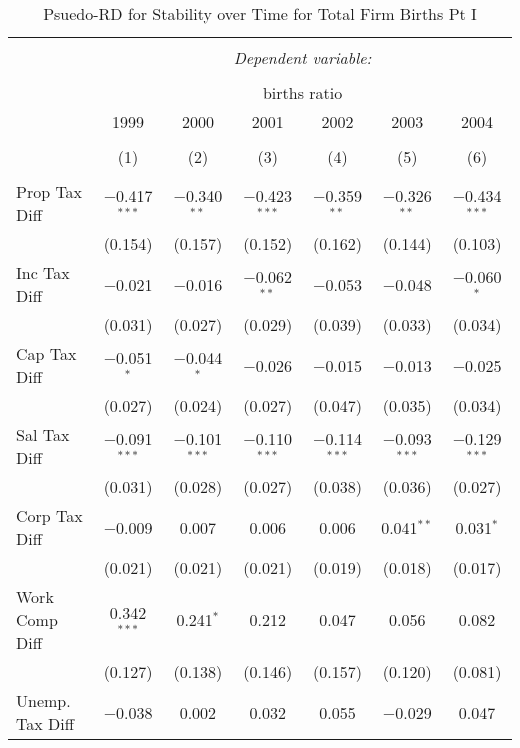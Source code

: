 
\begin{table}[!htbp] \centering 
  \caption{Psuedo-RD for Stability over Time for  Total Firm Births Pt I} 
  \label{--year} 
\small 
\begin{tabular}{@{\extracolsep{5pt}}lcccccc} 
\\[-1.8ex]\hline 
\hline \\[-1.8ex] 
 & \multicolumn{6}{c}{\textit{Dependent variable:}} \\ 
\cline{2-7} 
\\[-1.8ex] & \multicolumn{6}{c}{births ratio} \\ 
 & 1999 & 2000 & 2001 & 2002 & 2003 & 2004 \\ 
\\[-1.8ex] & (1) & (2) & (3) & (4) & (5) & (6)\\ 
\hline \\[-1.8ex] 
 Prop Tax Diff & $-$0.417$^{***}$ & $-$0.340$^{**}$ & $-$0.423$^{***}$ & $-$0.359$^{**}$ & $-$0.326$^{**}$ & $-$0.434$^{***}$ \\ 
  & (0.154) & (0.157) & (0.152) & (0.162) & (0.144) & (0.103) \\ 
  Inc Tax Diff & $-$0.021 & $-$0.016 & $-$0.062$^{**}$ & $-$0.053 & $-$0.048 & $-$0.060$^{*}$ \\ 
  & (0.031) & (0.027) & (0.029) & (0.039) & (0.033) & (0.034) \\ 
  Cap Tax Diff & $-$0.051$^{*}$ & $-$0.044$^{*}$ & $-$0.026 & $-$0.015 & $-$0.013 & $-$0.025 \\ 
  & (0.027) & (0.024) & (0.027) & (0.047) & (0.035) & (0.034) \\ 
  Sal Tax Diff & $-$0.091$^{***}$ & $-$0.101$^{***}$ & $-$0.110$^{***}$ & $-$0.114$^{***}$ & $-$0.093$^{***}$ & $-$0.129$^{***}$ \\ 
  & (0.031) & (0.028) & (0.027) & (0.038) & (0.036) & (0.027) \\ 
  Corp Tax Diff & $-$0.009 & 0.007 & 0.006 & 0.006 & 0.041$^{**}$ & 0.031$^{*}$ \\ 
  & (0.021) & (0.021) & (0.021) & (0.019) & (0.018) & (0.017) \\ 
  Work Comp Diff & 0.342$^{***}$ & 0.241$^{*}$ & 0.212 & 0.047 & 0.056 & 0.082 \\ 
  & (0.127) & (0.138) & (0.146) & (0.157) & (0.120) & (0.081) \\ 
  Unemp. Tax Diff & $-$0.038 & 0.002 & 0.032 & 0.055 & $-$0.029 & 0.047 \\ 

\end{tabular}
\end{table}
